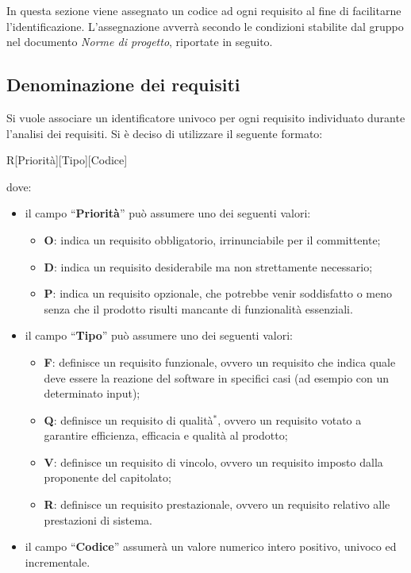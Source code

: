 In questa sezione viene assegnato un codice ad ogni requisito al fine di facilitarne l'identificazione. L'assegnazione avverrà secondo le condizioni stabilite dal gruppo nel documento \textit{Norme di progetto}, riportate in seguito. 
\subsection{Denominazione dei requisiti}
Si vuole associare un identificatore univoco per ogni requisito individuato durante l'analisi dei requisiti. Si \`e deciso di utilizzare il seguente formato:
  \begin{center}
    R[Priorità][Tipo][Codice]
	\end{center}
dove:
	\begin{itemize}
	\item il campo “\textbf{Priorità}” può assumere uno dei seguenti 	valori:
		\begin{itemize}
  		\item \textbf{O}: indica un requisito obbligatorio, irrinunciabile per il committente;
		\item \textbf{D}: indica un requisito desiderabile ma non strettamente necessario;
		\item \textbf{P}: indica un requisito opzionale, che potrebbe venir soddisfatto o meno senza che il prodotto risulti mancante di funzionalità essenziali.
		\end{itemize}
	\item il campo “\textbf{Tipo}” può assumere uno dei seguenti valori:
		\begin{itemize}
  		\item \textbf{F}: definisce un requisito funzionale, ovvero un requisito che indica quale deve essere la reazione del software in specifici casi (ad esempio con  un determinato input);
		\item \textbf{Q}: definisce un requisito di qualità$^*$, ovvero un requisito votato a garantire efficienza, efficacia e qualità al prodotto;
		\item \textbf{V}: definisce un requisito di vincolo, ovvero un requisito imposto dalla proponente del capitolato;
		\item \textbf{R}: definisce un requisito prestazionale, ovvero un requisito relativo alle prestazioni di sistema.
		\end{itemize}
	\item il campo “\textbf{Codice}” assumerà un valore numerico intero positivo, univoco ed incrementale.
	\end{itemize}
	
